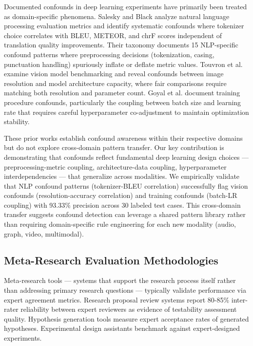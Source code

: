 Documented confounds in deep learning experiments have primarily been treated as domain-specific phenomena. Salesky and Black \cite{salesky2020} analyze natural language processing evaluation metrics and identify systematic confounds where tokenizer choice correlates with BLEU, METEOR, and chrF scores independent of translation quality improvements. Their taxonomy documents 15 NLP-specific confound patterns where preprocessing decisions (tokenization, casing, punctuation handling) spuriously inflate or deflate metric values. Touvron et al. \cite{touvron2019} examine vision model benchmarking and reveal confounds between image resolution and model architecture capacity, where fair comparisons require matching both resolution and parameter count. Goyal et al. \cite{goyal2017} document training procedure confounds, particularly the coupling between batch size and learning rate that requires careful hyperparameter co-adjustment to maintain optimization stability.

These prior works establish confound awareness within their respective domains but do not explore cross-domain pattern transfer. Our key contribution is demonstrating that confounds reflect fundamental deep learning design choices --- preprocessing-metric coupling, architecture-data coupling, hyperparameter interdependencies --- that generalize across modalities. We empirically validate that NLP confound patterns (tokenizer-BLEU correlation) successfully flag vision confounds (resolution-accuracy correlation) and training confounds (batch-LR coupling) with 93.33\% precision across 30 labeled test cases. This cross-domain transfer suggests confound detection can leverage a shared pattern library rather than requiring domain-specific rule engineering for each new modality (audio, graph, video, multimodal).

\subsection{Meta-Research Evaluation Methodologies}

Meta-research tools --- systems that support the research process itself rather than addressing primary research questions --- typically validate performance via expert agreement metrics. Research proposal review systems report 80-85\% inter-rater reliability between expert reviewers as evidence of testability assessment quality. Hypothesis generation tools measure expert acceptance rates of generated hypotheses. Experimental design assistants benchmark against expert-designed experiments.

